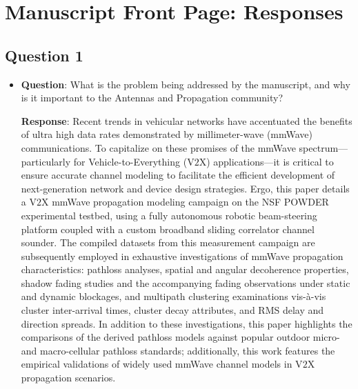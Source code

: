 \documentclass[12pt, draftcls, onecolumn]{IEEEtran}
\begin{document}

\maketitle
\thispagestyle{plain}
\pagestyle{plain}
\vspace{-18mm}

\section*{Manuscript Front Page: Responses}

\subsection{Question 1}
\begin{itemize}
\item \textbf{Question}: What is the problem being addressed by the manuscript, and why is it important to the Antennas and Propagation community?

\textbf{Response}: Recent trends in vehicular networks have accentuated the benefits of ultra high data rates demonstrated by millimeter-wave (mmWave) communications. To capitalize on these promises of the mmWave spectrum---particularly for Vehicle-to-Everything (V$2$X) applications---it is critical to ensure accurate channel modeling to facilitate the efficient development of next-generation network and device design strategies. Ergo, this paper details a V$2$X mmWave propagation modeling campaign on the NSF POWDER experimental testbed, using a fully autonomous robotic beam-steering platform coupled with a custom broadband sliding correlator channel sounder. The compiled datasets from this measurement campaign are subsequently employed in exhaustive investigations of mmWave propagation characteristics: pathloss analyses, spatial and angular decoherence properties, shadow fading studies and the accompanying fading observations under static and dynamic blockages, and multipath clustering examinations vis-\`{a}-vis cluster inter-arrival times, cluster decay attributes, and RMS delay and direction spreads. In addition to these investigations, this paper highlights the comparisons of the derived pathloss models against popular outdoor micro- and macro-cellular pathloss standards; additionally, this work features the empirical validations of widely used mmWave channel models in V$2$X propagation scenarios.
\end{itemize}
\end{document}
